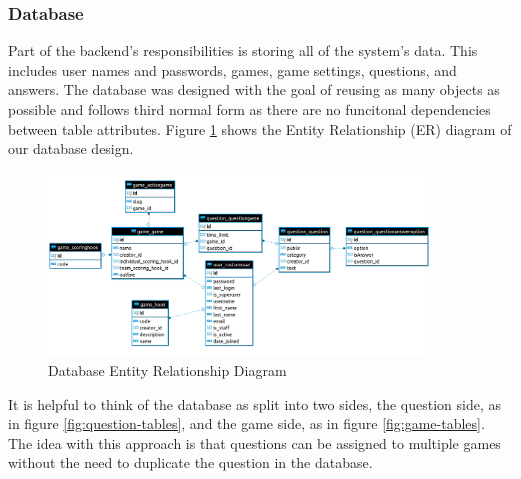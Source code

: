 \documentclass{article}
\begin{document}
		\subsubsection{Database}\label{database}
    		Part of the backend's responsibilities is storing all of the system's data. This includes user names and passwords, games, game settings, questions, and answers. The database was designed with the goal of reusing as many objects as possible and follows third normal form as there are no funcitonal dependencies between table attributes. Figure \ref{fig:database-er_diagram} shows the Entity Relationship (ER) diagram of our database design.
    		
            \begin{figure}[ht]
                \centering
                \includegraphics[width=0.9\textwidth]{images/database-er_diagram.png}
                \caption{Database Entity Relationship Diagram}
                \label{fig:database-er_diagram}
            \end{figure}
            
            It is helpful to think of the database as split into two sides, the question side, as in figure \ref{fig:question-tables}, and the game side, as in figure \ref{fig:game-tables}. The idea with this approach is that questions can be assigned to multiple games without the need to duplicate the question in the database.
            
\end{document}
